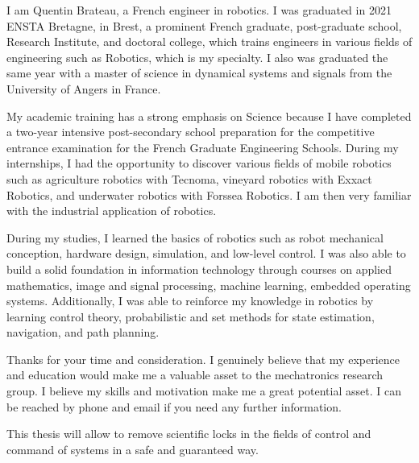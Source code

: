 \documentclass[11pt, a4paper]{awesome-cv}
\begin{document}
	\makecvheader[C]


	\makelettertitle

	\begin{cvletter}

		I am Quentin Brateau, a French engineer in robotics. I was graduated in 2021 ENSTA Bretagne, in Brest, a prominent French graduate, post-graduate school, Research Institute, and doctoral college, which trains engineers in various fields of engineering such as Robotics, which is my specialty. I also was graduated the same year with a master of science in dynamical systems and signals from the University of Angers in France.

		My academic training has a strong emphasis on Science because I have completed a two-year intensive post-secondary school preparation for the competitive entrance examination for the French Graduate Engineering Schools. During my internships, I had the opportunity to discover various fields of mobile robotics such as agriculture robotics with Tecnoma, vineyard robotics with Exxact Robotics, and underwater robotics with Forssea Robotics. I am then very familiar with the industrial application of robotics.

		During my studies, I learned the basics of robotics such as robot mechanical conception, hardware design, simulation, and low-level control. I was also able to build a solid foundation in information technology through courses on applied mathematics, image and signal processing, machine learning, embedded operating systems. Additionally, I was able to reinforce my knowledge in robotics by learning control theory, probabilistic and set methods for state estimation, navigation, and path planning.

		Thanks for your time and consideration. I genuinely believe that my experience and education would make me a valuable asset to the mechatronics research group. I believe my skills and motivation make me a great potential asset. I can be reached by phone and email if you need any further information.



			This thesis will allow to remove scientific locks in the fields of control and command of systems in a safe and guaranteed way.


\end{cvletter}
\end{document}
